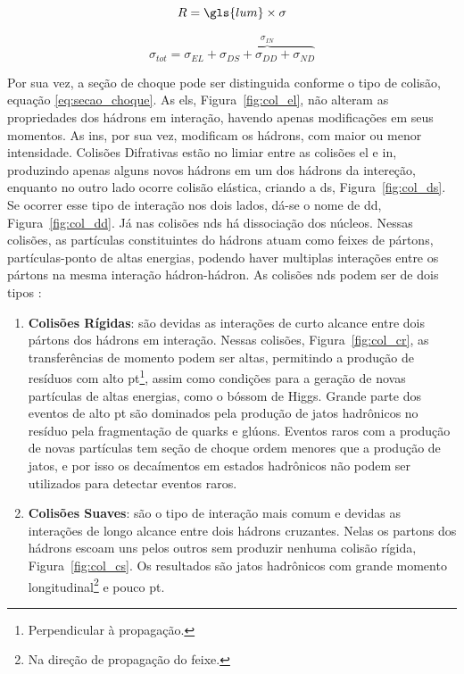 
\begin{equation}
R = \gls{lum} \times \sigma
\label{eq:taxa_colisao}
\end{equation}

\begin{equation}
\sigma_{tot} =  \sigma_{EL} + \overbrace{\sigma_{DS} + \sigma_{DD} +
\sigma_{ND}}^{\sigma_{IN}}
\label{eq:secao_choque}
\end{equation}


Por sua vez, a seção de choque pode ser distinguida conforme o tipo de colisão,
equação \ref{eq:secao_choque}. As \glspl{el}, Figura~\ref{fig:col_el},
não alteram as propriedades dos hádrons em interação, havendo apenas 
modificações em seus momentos. As
\glspl{in}, por sua vez, modificam os hádrons, com maior ou menor intensidade. 
Colisões Difrativas estão no limiar entre as colisões \gls{el} e \gls{in},
produzindo apenas alguns novos hádrons em um dos hádrons da intereção, enquanto no outro
lado ocorre colisão elástica, criando a \gls{ds}, Figura~\ref{fig:col_ds}. 
Se ocorrer esse tipo de interação nos dois lados, dá-se o nome de \gls{dd},
Figura~\ref{fig:col_dd}. Já nas colisões \glspl{nd}
há dissociação dos núcleos. Nessas colisões, as partículas constituintes do
hádrons atuam como feixes de pártons, partículas-ponto de altas energias, podendo haver
multiplas interações entre os pártons na mesma interação hádron-hádron. 
As colisões \glspl{nd} podem ser de dois tipos \cite{THESIS_LAR,Underlying}:
\begin{enumerate}
\item \textbf{Colisões Rígidas}:
são devidas as interações de curto alcance entre dois pártons dos hádrons em
interação. Nessas colisões, Figura~\ref{fig:col_cr}, as transferências de momento podem ser altas,
permitindo a produção de resíduos com alto \gls{pt}\footnote{Perpendicular à
propagação.}, assim como condições para a geração de novas partículas de altas
energias, como o bóssom de Higgs. Grande parte dos eventos de alto \gls{pt} são
dominados pela produção de jatos hadrônicos no resíduo pela fragmentação de
quarks e glúons. Eventos raros com a produção de novas partículas tem seção de
choque ordem menores que a produção de jatos, e por isso os decaímentos em
estados hadrônicos não podem ser utilizados para detectar eventos raros. 
\item \textbf{Colisões Suaves}: 
são o tipo de interação mais comum e devidas as interações de longo alcance entre
dois hádrons cruzantes. Nelas os partons dos hádrons escoam uns pelos outros sem produzir
nenhuma colisão rígida, Figura~\ref{fig:col_cs}. Os resultados são jatos hadrônicos com grande momento 
longitudinal\footnote{Na direção de propagação do feixe.} e pouco \gls{pt}.
\end{enumerate}

